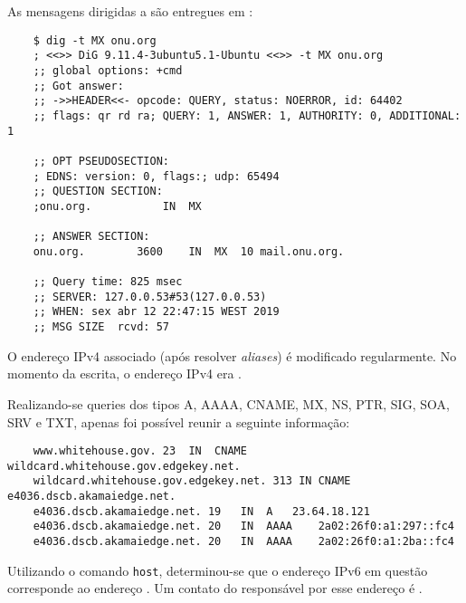 \noindent As mensagens dirigidas a  são entregues em :

\begin{verbatim}
    $ dig -t MX onu.org
    ; <<>> DiG 9.11.4-3ubuntu5.1-Ubuntu <<>> -t MX onu.org
    ;; global options: +cmd
    ;; Got answer:
    ;; ->>HEADER<<- opcode: QUERY, status: NOERROR, id: 64402
    ;; flags: qr rd ra; QUERY: 1, ANSWER: 1, AUTHORITY: 0, ADDITIONAL: 1
    
    ;; OPT PSEUDOSECTION:
    ; EDNS: version: 0, flags:; udp: 65494
    ;; QUESTION SECTION:
    ;onu.org.			IN	MX
    
    ;; ANSWER SECTION:
    onu.org.		3600	IN	MX	10 mail.onu.org.
    
    ;; Query time: 825 msec
    ;; SERVER: 127.0.0.53#53(127.0.0.53)
    ;; WHEN: sex abr 12 22:47:15 WEST 2019
    ;; MSG SIZE  rcvd: 57
\end{verbatim}



\noindent O endereço IPv4 associado (após resolver \emph{aliases}) é modificado regularmente. No momento da escrita, o endereço IPv4 era .

Realizando-se queries dos tipos A, AAAA, CNAME, MX, NS, PTR, SIG, SOA, SRV e TXT, apenas foi possível reunir a seguinte informação:

\begin{verbatim}
    www.whitehouse.gov.	23	IN	CNAME	wildcard.whitehouse.gov.edgekey.net.
    wildcard.whitehouse.gov.edgekey.net. 313 IN CNAME e4036.dscb.akamaiedge.net.
    e4036.dscb.akamaiedge.net. 19	IN	A	23.64.18.121
    e4036.dscb.akamaiedge.net. 20	IN	AAAA	2a02:26f0:a1:297::fc4
    e4036.dscb.akamaiedge.net. 20	IN	AAAA	2a02:26f0:a1:2ba::fc4
\end{verbatim}



\noindent Utilizando o comando \texttt{host}, determinou-se que o endereço IPv6 em questão corresponde ao endereço . Um contato do responsável por esse endereço é .

